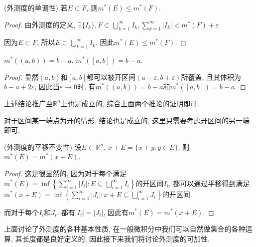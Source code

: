 \documentclass[theorem=false,mathfont=none,openany,sub3section]{easybook}
\begin{document}
\begin{proposition}
  (外测度的单调性) 若$E\subset F$, 则$m^{*}(E)\leqslant m^{*}(F)$.\par
\end{proposition}

\begin{proof}
  由外测度的定义, $\exists \{I_k\}, F\subset \bigcup_{k=1}^{\infty}I_k, \sum_{k=1}^{\infty}|I_k|<m^{*}(F)+\varepsilon$.\par
  因为$E\subset F$, 所以$E\subset \bigcup_{k=1}^{\infty}I_k$, 因此$m^{*}(E)\leqslant m^{*}(F)$.\par
\end{proof}

\begin{corollary}
  $m^{*}((a,b))=b-a$, $m^{*}([a,b])=b-a$.\par
\end{corollary}

\begin{proof}
  显然$(a,b)$和$[a,b]$都可以被开区间$(a-\varepsilon,b+\varepsilon)$所覆盖, 且其体积为$b-a+2\varepsilon$, 因此当$\varepsilon \to 0$时, 有$m^{*}((a,b))=b-a$和$m^{*}([a,b])=b-a$.\par
\end{proof}

\begin{remark}
  上述结论推广至$\mathbb{R}^n$上也是成立的, 综合上面两个推论的证明即可.\par
  对于区间某一端点为开的情形, 结论也是成立的, 这里只需要考虑开区间的另一端即可.\par
\end{remark}

\begin{theorem}
  (外测度的平移不变性) 设$E\subset \mathbb{R}^n$, $x+E=\{x+y:y\in E\}$, 则$m^{*}(E)=m^{*}(x+E)$.\par
\end{theorem}

\begin{proof}
  这是很显然的, 因为对于每个满足$m^{*}(E)=\inf\left\{\sum_{i=1}^{\infty}|I_i|: E\subseteq \bigcup_{i=1}^{\infty}I_i\right\}$的开区间$I_i$, 都可以通过平移得到满足$m^{*}(x+E)=\inf\left\{\sum_{i=1}^{\infty}|J_i|: x+E\subseteq \bigcup_{i=1}^{\infty}J_i\right\}$的开区间.\par
  而对于每个$I_i$和$J_i$, 都有$|I_i|=|J_i|$, 因此有$m^{*}(E)=m^{*}(x+E)$.\par
\end{proof}

上面讨论了外测度的各种基本性质, 在一般微积分中我们可以自然做集合的各种运算, 其长度都是良好定义的, 因此接下来我们将讨论外测度的可加性.\par
\end{document}
